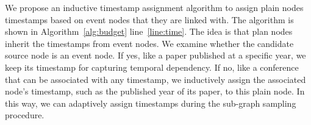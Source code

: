 \documentclass[sigconf]{acmart}
\theoremstyle{definition}
\begin{document}
We propose an inductive timestamp assignment algorithm to assign plain nodes timestamps based on event nodes that they are linked with. 
The algorithm is shown in Algorithm~\ref{alg:budget} line~\ref{line:time}. 
The  idea is that plan nodes inherit the timestamps from event nodes. 
We examine whether the candidate source node is an event node. If yes, like a paper published at a specific year, we keep its timestamp for capturing temporal dependency. 
If no, like a conference that can be associated with any timestamp, we inductively assign the associated node's timestamp, such as the published year of its paper, to this plain node. In this way, we can adaptively assign timestamps during the sub-graph sampling procedure.
\end{document}
